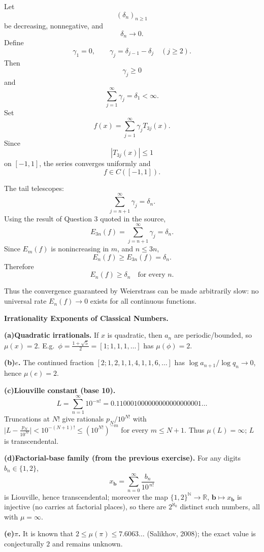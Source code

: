 \begin{solution}
Let
\[
(\delta_n)_{n\ge1}
\]
be decreasing, nonnegative, and
\[
\delta_n\to0.
\]
Define
\[
\gamma_1=0,
\qquad
\gamma_j
=
\delta_{j-1}-\delta_j
\quad(j\ge2).
\]
Then
\[
\gamma_j\ge0
\]
and
\[
\sum_{j=1}^{\infty}\gamma_j
=
\delta_1<\infty.
\]
Set
\[
f(x)
=
\sum_{j=1}^{\infty}
\gamma_jT_{3j}(x).
\]
Since
\[
|T_{3j}(x)|\le1
\]
on \([-1,1]\), the series converges uniformly and
\[
f\in C([-1,1]).
\]

The tail telescopes:
\[
\sum_{j=n+1}^{\infty}\gamma_j
=
\delta_n.
\]
Using the result of Question 3 quoted in the source,
\[
E_{3n}(f)
=
\sum_{j=n+1}^{\infty}\gamma_j
=
\delta_n.
\]
Since \(E_m(f)\) is nonincreasing in \(m\), and \(n\le3n\),
\[
E_n(f)
\ge
E_{3n}(f)
=
\delta_n.
\]
Therefore
\[
\boxed{
E_n(f)\ge\delta_n
\quad\text{for every }n.
}
\]

Thus the convergence guaranteed by Weierstrass can be made arbitrarily slow: no universal
rate \(E_n(f)\to0\) exists for all continuous functions.
\end{solution}


\begin{problem}[CP-II-0331]
\label{prob:cp-ii-0331}
\textbf{Irrationality Exponents of Classical Numbers.}

\hfill

		\par\smallskip\noindent\textbf{(a)}\quad \textbf{Quadratic irrationals.} If $x$ is quadratic, then $a_n$ are periodic/bounded,
		so $\mu(x)=2$. E.g.\ $\phi=\frac{1+\sqrt5}{2}=[1;1,1,1,\dots]$ has $\mu(\phi)=2$.
		\par\smallskip\noindent\textbf{(b)}\quad \textbf{$e$.} The continued fraction $[2;1,2,1,1,4,1,1,6,\dots]$ has
		$\log a_{n+1}/\log q_n\to0$, hence $\mu(e)=2$.
		\par\smallskip\noindent\textbf{(c)}\quad \textbf{Liouville constant (base 10).}
		\[
		L=\sum_{n=1}^\infty 10^{-n!}=0.110001000000000000000001\ldots
		\]
		Truncations at $N!$ give rationals $p_N/10^{N!}$ with
		$\bigl|L-\frac{p_N}{10^{N!}}\bigr|<10^{-(N+1)!}\le (10^{N!})^{-m}$ for every $m\le N+1$.
		Thus $\mu(L)=\infty$; $L$ is transcendental.
		\par\smallskip\noindent\textbf{(d)}\quad \textbf{Factorial-base family (from the previous exercise).}
		For any digits $b_n\in\{1,2\}$,
		\[
		x_{\mathbf b}=\sum_{n=0}^\infty \frac{b_n}{10^{\,n!}}
		\]
		is Liouville, hence transcendental; moreover the map $\{1,2\}^{\mathbb N}\to\mathbb R$,
		$\mathbf b\mapsto x_{\mathbf b}$ is injective (no carries at factorial places), so there are
		$2^{\aleph_0}$ distinct such numbers, all with $\mu=\infty$.
		\par\smallskip\noindent\textbf{(e)}\quad \textbf{$\pi$.} It is known that $2\le \mu(\pi)\le 7.6063\ldots$ (Salikhov, 2008);
		the exact value is conjecturally $2$ and remains unknown.
\end{problem}

